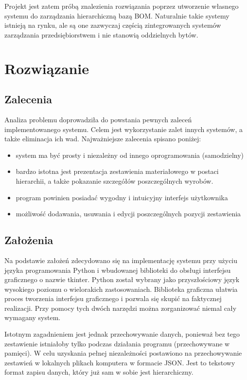 \documentclass[12pt,twoside]{article}
\begin{document}
Projekt jest zatem próbą znalezienia rozwiązania poprzez utworzenie własnego systemu do zarządzania hierarchiczną bazą BOM. Naturalnie takie systemy istnieją na rynku, ale są one zazwyczaj częścią zintegrowanych systemów zarządzania przedsiębiorstwem i nie stanowią oddzielnych bytów.

\clearpage
\section{Rozwiązanie}

\subsection*{Zalecenia}
Analiza problemu doprowadziła do powstania pewnych zaleceń implementowanego systemu. Celem jest wykorzystanie zalet innych systemów, a także eliminacja ich wad. Najważniejsze zalecenia spisano poniżej:

\begin{itemize}[label=-,labelsep=0.4cm,leftmargin=0.6cm]
\item system ma być prosty i niezależny od innego oprogramowania (samodzielny)
\item bardzo istotna jest prezentacja zestawienia materiałowego w postaci hierarchii, a także pokazanie szczegółów poszczególnych wyrobów. 
\item program powinien posiadać wygodny i intuicyjny interfejs użytkownika
\item możliwość dodawania, usuwania i edycji poszczególnych pozycji zestawienia
\end{itemize}

\subsection*{Założenia}
Na podstawie założeń zdecydowano się na implementację systemu przy użyciu języka programowania Python i wbudowanej biblioteki do obsługi interfejsu graficznego o nazwie tkinter. Python został wybrany jako  przyszłościowy język wysokiego poziomu o wielorakich zastosowaniach. Biblioteka graficzna ułatwia proces tworzenia interfejsu graficznego i pozwala się skupić na faktycznej realizacji. Przy pomocy tych dwóch narzędzi można zorganizować niemal cały wymagany system.

Istotnym zagadnieniem jest jednak przechowywanie danych, ponieważ bez tego zestawienie istniałoby tylko podczas działania programu (przechowywane w pamięci). W celu uzyskania pełnej niezależności postawiono na przechowywanie zestawień w lokalnych plikach komputera w formacie JSON. Jest to tekstowy format zapisu danych, który już sam w sobie jest hierarchiczny.
\end{document}
